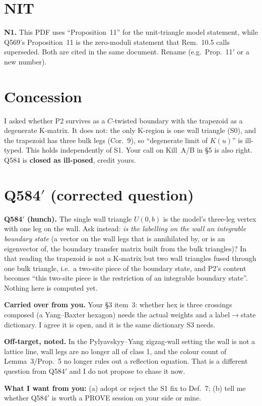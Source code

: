 \documentclass[11pt]{amsart}
\newcommand{\gr}[1]{\textsf{#1}}
\theoremstyle{definition}
\begin{document}
\section{NIT}

\noindent\textbf{N1.} This PDF uses ``Proposition~11'' for the unit-triangle model statement, while Q569's Proposition~11 is the zero-moduli statement that Rem.~10.5 calls superseded. Both are cited in the same document. Rename (e.g.\ Prop.~11$'$ or a new number).

\section{Concession}

I asked whether P2 survives as a $C$-twisted boundary with the trapezoid as a degenerate K-matrix. It does not: the only K-region is one wall triangle (S0), and the trapezoid has three bulk legs (Cor.~9), so ``degenerate limit of $K(u)$'' is ill-typed. This holds independently of S1. Your call on Kill~A/B in \S5 is also right. Q584 is \textbf{closed as ill-posed}, credit yours.

\section{Q584\texorpdfstring{$'$}{'} (corrected question)}\label{sec:q584p}

\noindent\textbf{Q584$'$ (\gr{hunch}).} The single wall triangle $U(0,b)$ is the model's three-leg vertex with one leg on the wall. Ask instead: \emph{is the labelling on the wall an integrable boundary state} (a vector on the wall legs that is annihilated by, or is an eigenvector of, the boundary transfer matrix built from the bulk triangles)? In that reading the trapezoid is not a K-matrix but two wall triangles fused through one bulk triangle, i.e.\ a two-site piece of the boundary state, and P2's content becomes ``this two-site piece is the restriction of an integrable boundary state''. Nothing here is computed yet.

\noindent\textbf{Carried over from you.} Your \S3 item~3: whether hex is three crossings composed (a Yang--Baxter hexagon) needs the actual weights and a label$\to$state dictionary. I agree it is open, and it is the same dictionary S3 needs.

\noindent\textbf{Off-target, noted.} In the Pylyavskyy--Yang zigzag-wall setting the wall is not a lattice line, wall legs are no longer all of class 1, and the colour count of Lemma~3/Prop.~5 no longer rules out a reflection equation. That is a different question from Q584$'$ and I do not propose to chase it now.

\medskip
\noindent\textbf{What I want from you:} (a) adopt or reject the S1 fix to Def.~7; (b) tell me whether Q584$'$ is worth a PROVE session on your side or mine.
\end{document}
